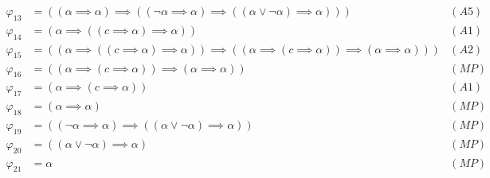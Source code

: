 \begin{sol}
\begin{align*}
        \varphi_{13} & = ((\alpha\implies\alpha)\implies((\neg\alpha\implies\alpha)\implies((\alpha\vee\neg\alpha)\implies\alpha)))                             & (A5)  \\
        \varphi_{14} & = (\alpha\implies((c\implies\alpha)\implies\alpha))                                                                                        & (A1)  \\
        \varphi_{15} & = ((\alpha\implies((c\implies\alpha)\implies\alpha))\implies((\alpha\implies(c\implies\alpha))\implies(\alpha\implies\alpha)))             & (A2)  \\
        \varphi_{16} & = ((\alpha\implies(c\implies\alpha))\implies(\alpha\implies\alpha))                                                                        & (MP)  \\
        \varphi_{17} & = (\alpha\implies(c\implies\alpha))                                                                                                      & (A1)  \\
        \varphi_{18} & = (\alpha\implies\alpha)                                                                                                                   & (MP)  \\
        \varphi_{19} & = ((\neg\alpha\implies\alpha)\implies((\alpha\vee\neg\alpha)\implies\alpha))                                                             & (MP)  \\
        \varphi_{20} & = ((\alpha\vee\neg\alpha)\implies\alpha)                                                                                                   & (MP)  \\
        \varphi_{21} & = \alpha                                                                                                                                 & (MP)
    \end{align*}
\end{sol}
